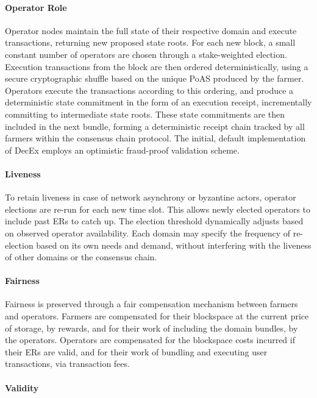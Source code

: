 \documentclass[conference]{IEEEtran}
\begin{document}
\paragraph{Operator Role}

Operator nodes maintain the full state of their respective domain and execute transactions, returning new proposed state roots. For each new block, a small constant number of operators are chosen through a stake-weighted election. Execution transactions from the block are then ordered deterministically, using a secure cryptographic shuffle based on the unique PoAS produced by the farmer. Operators execute the transactions according to this ordering, and produce a deterministic state commitment in the form of an execution receipt, incrementally committing to intermediate state roots. These state commitments are then included in the next bundle, forming a deterministic receipt chain tracked by all farmers within the consensus chain protocol. The initial, default implementation of DecEx employs an optimistic fraud-proof validation scheme.

\paragraph{Liveness}

To retain liveness in case of network asynchrony or byzantine actors, operator elections are re-run for each new time slot. This allows newly elected operators to include past ERs to catch up. The election threshold dynamically adjusts based on observed operator availability. Each domain may specify the frequency of re-election based on its own needs and demand, without interfering with the liveness of other domains or the consensus chain.

\paragraph{Fairness}

Fairness is preserved through a fair compensation mechanism between farmers and operators. Farmers are compensated for their blockspace at the current price of storage, by rewards, and for their work of including the domain bundles, by the operators. Operators are compensated for the blockspace costs incurred if their ERs are valid, and for their work of bundling and executing user transactions, via transaction fees.

\paragraph{Validity}
\end{document}
